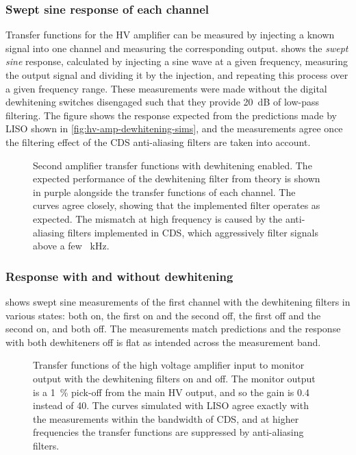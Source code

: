 \subsubsection{Swept sine response of each channel}
Transfer functions for the \gls{HV} amplifier can be measured by injecting a known signal into one channel and measuring the corresponding output.  shows the \emph{swept sine} response, calculated by injecting a sine wave at a given frequency, measuring the output signal and dividing it by the injection, and repeating this process over a given frequency range. These measurements were made without the digital dewhitening switches disengaged such that they provide \SI{20}{\deci\bel} of low-pass filtering. The figure shows the response expected from the predictions made by \gls{LISO} shown in \cref{fig:hv-amp-dewhitening-sims}, and the measurements agree once the filtering effect of the \gls{CDS} anti-aliasing filters are taken into account.

\begin{figure}
  \centering
  
  \caption[Frequency response of the high voltage amplifier's channels with dewhitening enabled]{Second amplifier transfer functions with dewhitening enabled. The expected performance of the dewhitening filter from theory is shown in purple alongside the transfer functions of each channel. The curves agree closely, showing that the implemented filter operates as expected. The mismatch at high frequency is caused by the anti-aliasing filters implemented in \gls{CDS}, which aggressively filter signals above a few \SI{}{\kilo\hertz}.}
  \label{fig:hv-amp-dewhitened-tfs}
\end{figure}

\subsubsection{Response with and without dewhitening}
 shows swept sine measurements of the first channel with the dewhitening filters in various states: both on, the first on and the second off, the first off and the second on, and both off. The measurements match predictions and the response with both dewhiteners off is flat as intended across the measurement band.

\begin{figure}
  \centering
  
  \caption[Transfer functions of the high voltage amplifier input to monitor output with the dewhiteners on and off]{Transfer functions of the high voltage amplifier input to monitor output with the dewhitening filters on and off. The monitor output is a \SI{1}{\percent} pick-off from the main \gls{HV} output, and so the gain is \num{0.4} instead of \num{40}. The curves simulated with \gls{LISO} agree exactly with the measurements within the bandwidth of \gls{CDS}, and at higher frequencies the transfer functions are suppressed by anti-aliasing filters.}
  \label{fig:hv-amp-channel-one-tfs}
\end{figure}

